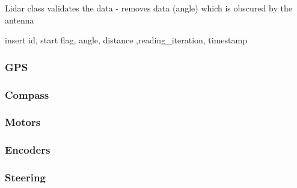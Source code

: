 Lidar class validates the data
 - removes data (angle) which is obscured by the antenna
 
 insert id, start flag, angle, distance ,reading_iteration, timestamp

\subsubsection{GPS}

\subsubsection{Compass}

\subsubsection{Motors}

\subsubsection{Encoders}

\subsubsection{Steering}







